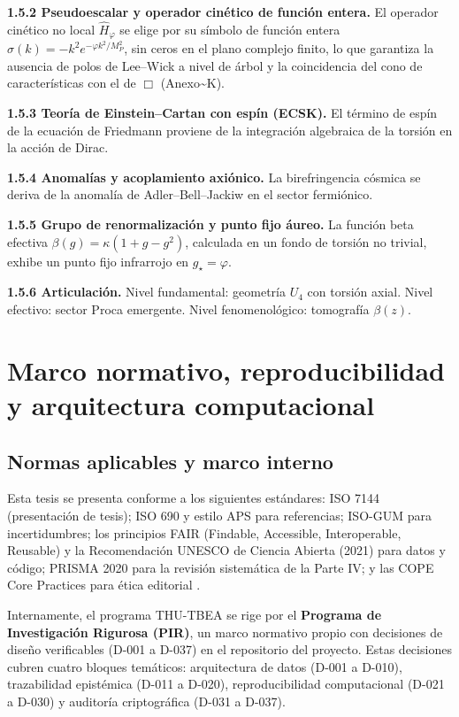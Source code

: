 ﻿\documentclass[11pt,letterpaper]{article}
\begin{document}
\textbf{1.5.2 Pseudoescalar y operador cinético de función entera.} El operador cinético no local $\hat{H}_\varphi$ se elige por su símbolo de función entera $\sigma(k) = -k^2 e^{-\varphi k^2 / M_P^2}$, sin ceros en el plano complejo finito, lo que garantiza la ausencia de polos de Lee--Wick a nivel de árbol y la coincidencia del cono de características con el de $\Box$ (Anexo\textasciitilde{}K).

\textbf{1.5.3 Teoría de Einstein--Cartan con espín (ECSK).} El término de espín de la ecuación de Friedmann proviene de la integración algebraica de la torsión en la acción de Dirac.

\textbf{1.5.4 Anomalías y acoplamiento axiónico.} La birefringencia cósmica se deriva de la anomalía de Adler--Bell--Jackiw en el sector fermiónico.

\textbf{1.5.5 Grupo de renormalización y punto fijo áureo.} La función beta efectiva $\beta(g) = \kappa(1 + g - g^2)$, calculada en un fondo de torsión no trivial, exhibe un punto fijo infrarrojo en $g_\star = \varphi$.

\textbf{1.5.6 Articulación.} Nivel fundamental: geometría $U_4$ con torsión axial. Nivel efectivo: sector Proca emergente. Nivel fenomenológico: tomografía $\beta(z)$.

\section{Marco normativo, reproducibilidad y arquitectura computacional}
\subsection{Normas aplicables y marco interno}
Esta tesis se presenta conforme a los siguientes estándares: ISO 7144 (presentación de tesis); ISO 690 y estilo APS para referencias; ISO-GUM para incertidumbres; los principios FAIR (Findable, Accessible, Interoperable, Reusable) y la Recomendación UNESCO de Ciencia Abierta (2021) para datos y código; PRISMA 2020 para la revisión sistemática de la Parte IV; y las COPE Core Practices para ética editorial \cite{ISO7144} \cite{ISO690} \cite{ISOGUM} \cite{FAIR2016} \cite{UNESCO2021} \cite{PRISMA2020} \cite{COPE}.

Internamente, el programa THU-TBEA se rige por el \textbf{Programa de Investigación Rigurosa (PIR)}, un marco normativo propio con decisiones de diseño verificables (D-001 a D-037) en el repositorio del proyecto. Estas decisiones cubren cuatro bloques temáticos: arquitectura de datos (D-001 a D-010), trazabilidad epistémica (D-011 a D-020), reproducibilidad computacional (D-021 a D-030) y auditoría criptográfica (D-031 a D-037).
\end{document}
